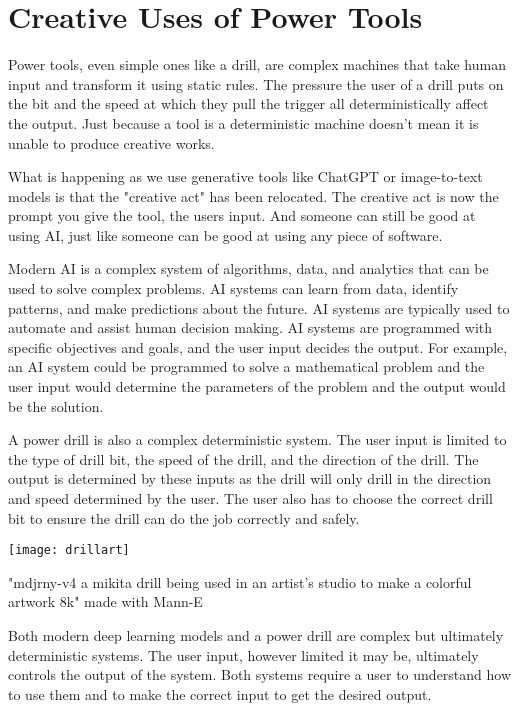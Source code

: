 \section{Creative Uses of Power Tools}

Power tools, even simple ones like a drill, are complex machines that take human input and transform it using static rules. The pressure the user of a drill puts on the bit and the speed at which they pull the trigger all deterministically affect the output. Just because a tool is a deterministic machine doesn’t mean it is unable to produce creative works.

What is happening as we use generative tools like ChatGPT or image-to-text models is that the "creative act" has been relocated. The creative act is now the prompt you give the tool, the users input. And someone can still be good at using AI, just like someone can be good at using any piece of software.

Modern AI is a complex system of algorithms, data, and analytics that can be used to solve complex problems. AI systems can learn from data, identify patterns, and make predictions about the future. AI systems are typically used to automate and assist human decision making. AI systems are programmed with specific objectives and goals, and the user input decides the output. For example, an AI system could be programmed to solve a mathematical problem and the user input would determine the parameters of the problem and the output would be the solution.

A power drill is also a complex deterministic system. The user input is limited to the type of drill bit, the speed of the drill, and the direction of the drill. The output is determined by these inputs as the drill will only drill in the direction and speed determined by the user. The user also has to choose the correct drill bit to ensure the drill can do the job correctly and safely.

\begin{pdf}
\begin{marginfigure}[-5.5cm]
        \texttt{[image: drillart]}
        \caption{"mdjrny-v4 a mikita drill being used in an artist's studio to make a colorful artwork 8k" made with Mann-E}
\end{marginfigure}
\end{pdf}

Both modern deep learning models and a power drill are complex but ultimately deterministic systems. The user input, however limited it may be, ultimately controls the output of the system. Both systems require a user to understand how to use them and to make the correct input to get the desired output.

